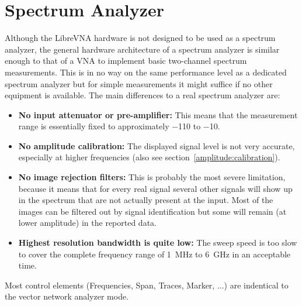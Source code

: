 \documentclass[a4paper,11pt]{article}
\newcommand{\vna}{LibreVNA}
\begin{document}
\section{Spectrum Analyzer}
Although the \vna{} hardware is not designed to be used as a spectrum analyzer, the general hardware architecture of a spectrum analyzer is similar enough to that of a VNA to implement basic two-channel spectrum measurements. This is in no way on the same performance level as a dedicated spectrum analyzer but for simple measurements it might suffice if no other equipment is available. The main differences to a real spectrum analyzer are:
\begin{itemize}
\item \textbf{No input attenuator or pre-amplifier:} This means that the measurement range is essentially fixed to approximately \SI{-110}{\dBm} to \SI{-10}{\dBm}.
\item \textbf{No amplitude calibration:} The displayed signal level is not very accurate, especially at higher frequencies (also see section~\ref{amplitude:calibration}).
\item \textbf{No image rejection filters:} This is probably the most severe limitation, because it means that for every real signal several other signals will show up in the spectrum that are not actually present at the input. Most of the images can be filtered out by signal identification but some will remain (at lower amplitude) in the reported data.
\item \textbf{Highest resolution bandwidth is quite low:} The sweep speed is too slow to cover the complete frequency range of \SI{1}{\mega\hertz} to \SI{6}{\giga\hertz} in an acceptable time.
\end{itemize}

Most control elements (Frequencies, Span, Traces, Marker, ...) are indentical to the vector network analyzer mode.
\end{document}
